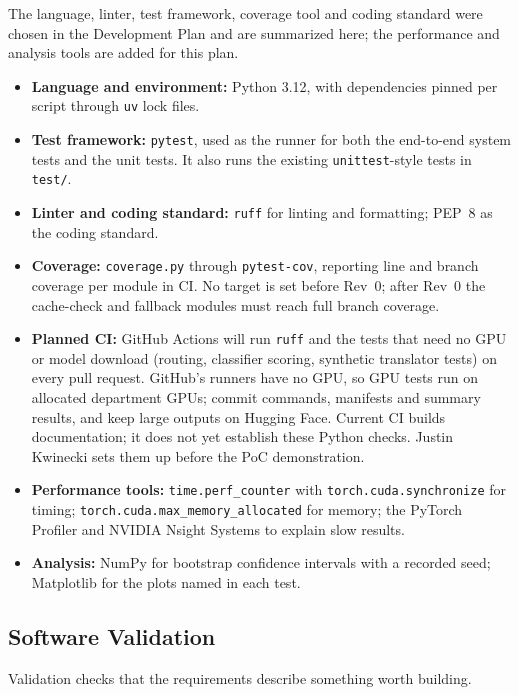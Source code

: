 \documentclass[12pt, titlepage]{article}
\begin{document}
The language, linter, test framework, coverage tool and coding standard
were chosen in the Development Plan \citep[Sections~10 and~12]{TandemDevPlan}
and are summarized here; the performance and analysis tools are added for
this plan.

\begin{itemize}
  \item \textbf{Language and environment:} Python 3.12, with dependencies
  pinned per script through \texttt{uv} lock files.
  \item \textbf{Test framework:} \texttt{pytest}, used as the runner for
  both the end-to-end system tests and the unit tests. It also runs the
  existing \texttt{unittest}-style tests in \texttt{test/}.
  \item \textbf{Linter and coding standard:} \texttt{ruff} for linting and
  formatting; PEP~8 as the coding standard.
  \item \textbf{Coverage:} \texttt{coverage.py} through \texttt{pytest-cov},
  reporting line and branch coverage per module in CI. No target is set
  before Rev~0; after Rev~0 the cache-check and fallback modules must reach
  full branch coverage.
  \item \textbf{Planned CI:} GitHub Actions will run \texttt{ruff} and the tests that
  need no GPU or model download (routing, classifier scoring, synthetic
  translator tests) on every pull request. GitHub's runners have no GPU, so
  GPU tests run on allocated department GPUs; commit commands, manifests
  and summary results, and keep large outputs on Hugging Face. Current CI
  builds documentation; it does not yet establish these Python checks.
  Justin Kwinecki sets them up before the PoC demonstration.
  \item \textbf{Performance tools:} \texttt{time.perf\_counter} with
  \texttt{torch.cuda.synchronize} for timing;
  \texttt{torch.cuda.max\_memory\_allocated} for memory; the PyTorch
  Profiler and NVIDIA Nsight Systems to explain slow results.
  \item \textbf{Analysis:} NumPy for bootstrap confidence intervals with a
  recorded seed; Matplotlib for the plots named in each test.
\end{itemize}

\subsection{Software Validation}
\label{sec:validation}

Validation checks that the requirements describe something worth building.
\end{document}
